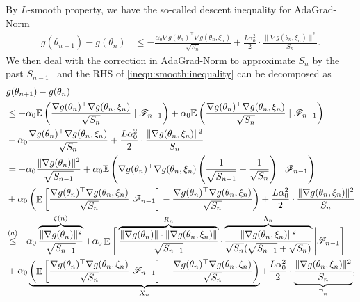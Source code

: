 \documentclass[standalone]{article}
\newcommand{\E}{\mathbb{E}}
\DeclareMathOperator{\Expect}{\mathbb{E}}
\begin{document}
By $ L$-smooth property, we have the so-called descent inequality for AdaGrad-Norm
\begin{align}\label{inequ:smooth:inequality}
g(\theta_{n+1})-g(\theta_{n}) & \le -\frac{\alpha_{0}\nabla g(\theta_{n})^{\top}\nabla g(\theta_{n},\xi_{n})}{\sqrt{S_{n}}}+\frac{ L\alpha_{0}^{2}}{2}\cdot\frac{\|\nabla g(\theta_{n},\xi_{n})\|^{2}}{S_{n}}.
\end{align}
We then deal with the correction in AdaGrad-Norm to approximate $S_n$ by the past $S_{n-1}$~\citep{ward2020adagrad,defossez2020simple,faw2022power,wang2023convergence} and the RHS of \cref{inequ:smooth:inequality} can be decomposed as
\begin{align}\label{inequ:sufficient:decrease}
& g(\theta_{n+1})-g(\theta_{n}) \notag\\ 
&\le- \alpha_{0}\E\left(\frac{\nabla g(\theta_{n})^{\top}\nabla g(\theta_{n},\xi_{n})}{\sqrt{S_{n}}} \mid \mathscr{F}_{n-1}\right) +\alpha_{0}\E\left(\frac{\nabla g(\theta_{n})^{\top}\nabla g(\theta_{n},\xi_{n})}{\sqrt{S_{n}}}  \mid \mathscr{F}_{n-1}\right) \notag \\& - \alpha_0\frac{\nabla g(\theta_{n})^{\top}\nabla g(\theta_{n},\xi_{n})}{\sqrt{S_{n}}}  + \frac{ L\alpha_{0}^{2}}{2}\cdot\frac{\|\nabla g(\theta_{n},\xi_{n})\|^{2}}{S_{n}}\notag\\& =  -\alpha_{0}\frac{\|\nabla g(\theta_{n})\|^{2}}{\sqrt{S_{n-1}}} +\alpha_{0}\E\left(\nabla g(\theta_{n})^{\top}\nabla g(\theta_{n},\xi_{n})\left(\frac{1}{\sqrt{S_{n-1}}} - \frac{1}{\sqrt{S_n}}\right) \mid \mathscr{F}_{n-1}\right) \notag\\&+\alpha_{0}\left(\Expect\bigg[\frac{\nabla g(\theta_{n})^{\top}\nabla g(\theta_{n},\xi_{n})}{\sqrt{S_{n}}}\bigg|\mathscr{F}_{n-1}\bigg]-\frac{\nabla g(\theta_{n})^{\top}\nabla g(\theta_{n},\xi_{n})}{\sqrt{S_{n}}}\right)  + \frac{ L\alpha_{0}^{2}}{2}\cdot \frac{\|\nabla g(\theta_{n},\xi_{n})\|^{2}}{S_{n}} \notag \\
& \mathop{\leq}^{(a)} -\alpha_{0}\overbrace{\frac{\|\nabla g(\theta_{n})\|^{2}}{\sqrt{S_{n-1}}}}^{\zeta(n)}+\alpha_{0}\Expect\Bigg[\overbrace{\frac{\|\nabla g(\theta_{n})\|\cdot \|\nabla g(\theta_{n},\xi_{n})\|}{\sqrt{S_{n-1}}}}^{R_n}\cdot \overbrace{\frac{\|\nabla g(\theta_{n},\xi_{n})\|^{2}}{\sqrt{S_{n}}(\sqrt{S_{n-1}}+\sqrt{S_{n}})}}^{\Lambda_n}\Bigg|\mathscr{F}_{n-1}\Bigg]\notag \\
&
+\alpha_{0}\underbrace{\left(\Expect\bigg[\frac{\nabla g(\theta_{n})^{\top}\nabla g(\theta_{n},\xi_{n})}{\sqrt{S_{n}}}\bigg|\mathscr{F}_{n-1}\bigg]-\frac{\nabla g(\theta_{n})^{\top}\nabla g(\theta_{n},\xi_{n})}{\sqrt{S_{n}}}\right)}_{X_n}  + \frac{ L\alpha_{0}^{2}}{2}\cdot \underbrace{\frac{\|\nabla g(\theta_{n},\xi_{n})\|^{2}}{S_{n}}}_{\Gamma_n},
\end{align} 
\end{document}

